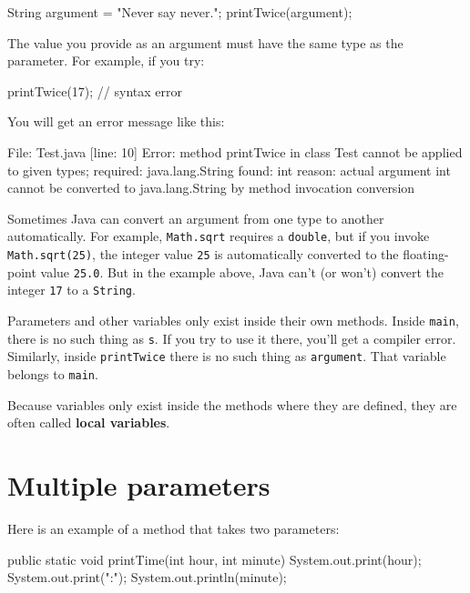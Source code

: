 \documentclass[12pt]{book}
\theoremstyle{exercise}
\newcommand{\java}[1]{\verb"#1"}
\begin{document}
\begin{code}
    String argument = "Never say never.";
    printTwice(argument);
\end{code}

The value you provide as an argument must have the same type as the parameter.
For example, if you try:

\begin{code}
    printTwice(17);  // syntax error
\end{code}

You will get an error message like this:

\begin{stdout}
File: Test.java  [line: 10]
Error: method printTwice in class Test cannot be applied
       to given types;
  required: java.lang.String
  found: int
  reason: actual argument int cannot be converted to
          java.lang.String by method invocation conversion
\end{stdout}

Sometimes Java can convert an argument from one type to another automatically.
For example, \java{Math.sqrt} requires a \java{double}, but if you invoke \java{Math.sqrt(25)}, the integer value \java{25} is automatically converted to the floating-point value \java{25.0}.
But in the example above, Java can't (or won't) convert the integer \java{17} to a \java{String}.

Parameters and other variables only exist inside their own methods.
Inside \java{main}, there is no such thing as \java{s}.
If you try to use it there, you'll get a compiler error.
Similarly, inside \java{printTwice} there is no such thing as \java{argument}.
That variable belongs to \java{main}.


Because variables only exist inside the methods where they are defined, they are often called {\bf local variables}.


\section{Multiple parameters}
\label{time}


Here is an example of a method that takes two parameters:

\begin{code}
    public static void printTime(int hour, int minute) {
        System.out.print(hour);
        System.out.print(":");
        System.out.println(minute);
    }
\end{code}
\end{document}

